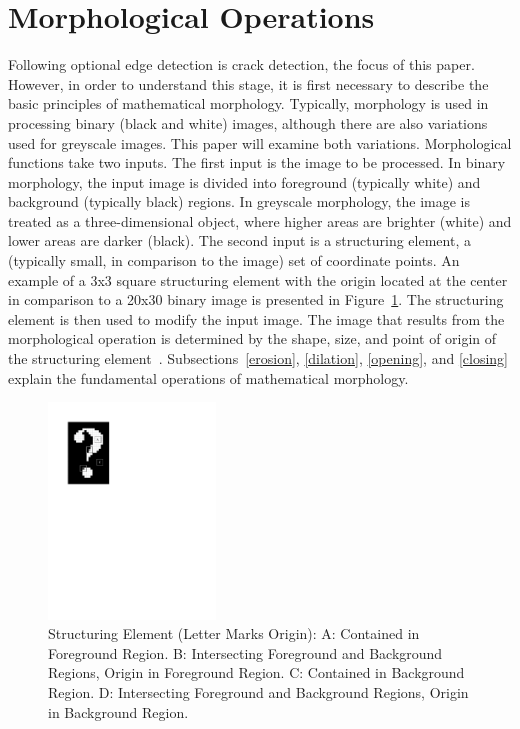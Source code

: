 \documentclass{sig-alternate}
\begin{document}
\section{Morphological Operations}\label{morphological operations}
Following optional edge detection is crack detection, the focus of this paper. However, in order to understand this stage, it is first necessary to describe the basic principles of mathematical morphology. Typically, morphology is used in processing binary (black and white) images, although there are also variations used for greyscale images. This paper will examine both variations. Morphological functions take two inputs. The first input is the image to be processed. In binary morphology, the input image is divided into foreground (typically white) and background (typically black) regions. In greyscale morphology, the image is treated as a three-dimensional object, where higher areas are brighter (white) and lower areas are darker (black). The second input is a structuring element, a (typically small, in comparison to the image) set of coordinate points. An example of a 3x3 square structuring element with the origin located at the center in comparison to a 20x30 binary image is presented in Figure~\ref{structuring element figure}. The structuring element is then used to modify the input image. The image that results from the morphological operation is determined by the shape, size, and point of origin of the structuring element~\cite{MorphologyWikiAnonymous, MorphologyBook:2000, MorphologyPaper:1987, MorphologyWiki}. Subsections~\ref{erosion}, \ref{dilation}, \ref{opening}, and \ref{closing} explain the fundamental operations of mathematical morphology.
\begin{figure}
\centering
\includegraphics[width=1.75in,trim={0 6.5in 4in 0},clip]{structuring_element_placement}
\caption{Structuring Element (Letter Marks Origin): A: Contained in Foreground Region. B: Intersecting Foreground and Background Regions, Origin in Foreground Region. C: Contained in Background Region. D: Intersecting Foreground and Background Regions, Origin in Background Region.}
\label{structuring element figure}
\end{figure}
\end{document}
